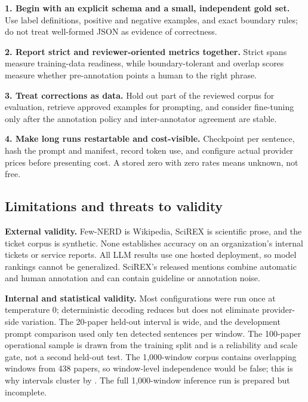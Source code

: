 \begin{takeaway}[title={Engineering recommendations}]
\small
\textbf{1. Begin with an explicit schema and a small, independent gold set.}
Use label definitions, positive and negative examples, and exact boundary rules;
do not treat well-formed JSON as evidence of correctness.

\textbf{2. Report strict and reviewer-oriented metrics together.} Strict spans
measure training-data readiness, while boundary-tolerant and overlap scores
measure whether pre-annotation points a human to the right phrase.

\textbf{3. Treat corrections as data.} Hold out part of the reviewed corpus for
evaluation, retrieve approved examples for prompting, and consider fine-tuning
only after the annotation policy and inter-annotator agreement are stable.

\textbf{4. Make long runs restartable and cost-visible.} Checkpoint per sentence,
hash the prompt and manifest, record token use, and configure actual provider
prices before presenting cost. A stored zero with zero rates means unknown, not
free.
\end{takeaway}

\subsection{Limitations and threats to validity}

\textbf{External validity.} Few-NERD is Wikipedia, SciREX is scientific prose,
and the ticket corpus is synthetic. None establishes accuracy on an
organization's internal tickets or service reports. All LLM results use one
hosted deployment, so model rankings cannot be generalized. SciREX's released
mentions combine automatic and human annotation and can contain guideline or
annotation noise.

\textbf{Internal and statistical validity.} Most configurations were run once
at temperature $0$; deterministic decoding reduces but does not eliminate
provider-side variation. The 20-paper held-out interval is wide, and the
development prompt comparison used only ten detected sentences per window.
The 100-paper operational sample is drawn from the training split and is a
reliability and scale gate, not a second held-out test. The 1{,}000-window corpus
contains overlapping windows from 438 papers, so window-level independence
would be false; this is why intervals cluster by . The full
1{,}000-window inference run is prepared but incomplete.

